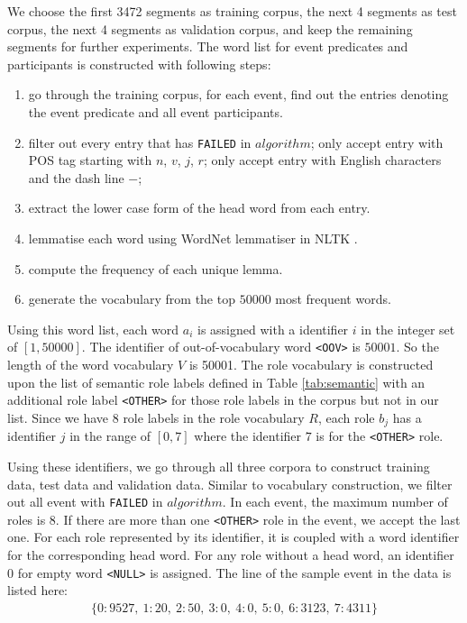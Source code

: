 \documentclass[a4paper]{article}
\begin{document}
We choose the first 3472 segments as training corpus, the next 4 segments as test corpus, the next 4 segments as validation corpus, and keep the remaining segments for further experiments. The word list for event predicates and participants is constructed with following steps: 
\begin{enumerate}
  \item  go through the training corpus, for each event, find out the entries denoting the event predicate and all event participants. 
  \item  filter out every entry that has \texttt{FAILED} in $algorithm$; only accept entry with POS tag starting with $n$, $v$, $j$, $r$; only accept entry with English characters and the dash line $-$; 
  \item  extract the lower case form of the head word from each entry.
  \item  lemmatise each word using WordNet \citep{miller1995wordnet} lemmatiser in NLTK \citep{bird2006nltk}. 
  \item  compute the frequency of each unique lemma. 
  \item  generate the vocabulary from the top $50000$ most frequent words. 
\end{enumerate}
Using this word list, each word $a_i$ is assigned with a identifier $i$ in the integer set of $[1, 50000]$. The identifier of out-of-vocabulary word \texttt{<OOV>} is $50001$. So the length of the word vocabulary $V$ is 50001. The role vocabulary is constructed upon the list of semantic role labels defined in Table \ref{tab:semantic} with an additional role label \texttt{<OTHER>} for those role labels in the corpus but not in our list. Since we have $8$ role labels in the role vocabulary $R$, each role $b_j$ has a identifier $j$ in the range of $[0, 7]$ where the identifier $7$ is for the \texttt{<OTHER>} role. 

Using these identifiers, we go through all three corpora to construct training data, test data and validation data. Similar to vocabulary construction, we filter out all event with \texttt{FAILED} in $algorithm$. In each event, the maximum number of roles is $8$. If there are more than one \texttt{<OTHER>} role in the event, we accept the last one. For each role represented by its identifier, it is coupled with a word identifier for the corresponding head word. For any role without a head word, an identifier $0$ for empty word \texttt{<NULL>} is assigned. The line of the sample event in the data is listed here: 
\begin{equation} \label{eq:eg-data}
\begin{aligned}
    \{ 0:9527,\ 1:20,\ 2:50,\ 3:0,\ 4:0,\ 5:0,\ 6:3123,\ 7:4311\}
\end{aligned}
\end{equation}
\end{document}

